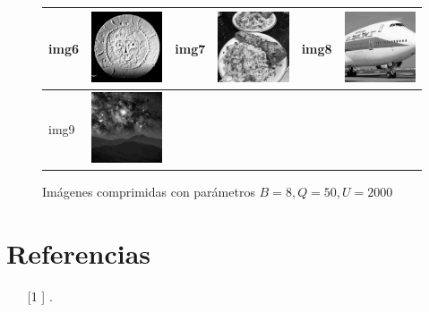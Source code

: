 \documentclass{article}
\begin{document}
\begin{figure}[!htp]
\begin{center}
\begin{tabular}[t]{|ll|ll|ll|}
\hline
img6 & \includegraphics[width=3cm]{../imgs/output/gray_8_50_2000/img06.png} &
img7 & \includegraphics[width=3cm]{../imgs/output/gray_8_50_2000/img07.png} &
img8 & \includegraphics[width=3cm]{../imgs/output/gray_8_50_2000/img08.png} \\
\hline
img9 & \includegraphics[width=3cm]{../imgs/output/gray_8_50_2000/img09.png} &&&& \\
\hline
\end{tabular}
\end{center}
\caption{Imágenes comprimidas con parámetros $B=8, Q=50, U=2000$}
\label{fig:imagenes_de_prueba_comprimidas_8_50_2000}
\end{figure}

\section*{Referencias}

\begin{itemize}
\item[[1]] .
\end{itemize}
\end{document}

